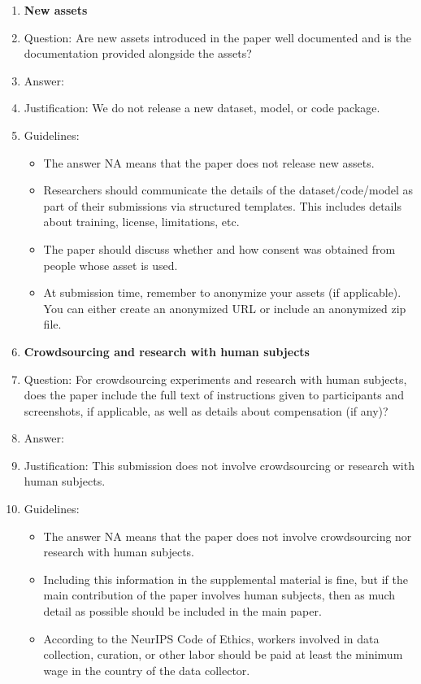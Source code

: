 \documentclass{article}
\begin{document}
\begin{enumerate}
\item {\bf New assets}
    \item[] Question: Are new assets introduced in the paper well documented and is the documentation provided alongside the assets?
    \item[] Answer: \answerNA{}
    \item[] Justification: We do not release a new dataset, model, or code package.
    \item[] Guidelines:
    \begin{itemize}
        \item The answer NA means that the paper does not release new assets.
        \item Researchers should communicate the details of the dataset/code/model as part of their submissions via structured templates. This includes details about training, license, limitations, etc. 
        \item The paper should discuss whether and how consent was obtained from people whose asset is used.
        \item At submission time, remember to anonymize your assets (if applicable). You can either create an anonymized URL or include an anonymized zip file.
    \end{itemize}

\item {\bf Crowdsourcing and research with human subjects}
    \item[] Question: For crowdsourcing experiments and research with human subjects, does the paper include the full text of instructions given to participants and screenshots, if applicable, as well as details about compensation (if any)? 
    \item[] Answer: \answerNA{}
    \item[] Justification: This submission does not involve crowdsourcing or research with human subjects.
    \item[] Guidelines:
    \begin{itemize}
        \item The answer NA means that the paper does not involve crowdsourcing nor research with human subjects.
        \item Including this information in the supplemental material is fine, but if the main contribution of the paper involves human subjects, then as much detail as possible should be included in the main paper. 
        \item According to the NeurIPS Code of Ethics, workers involved in data collection, curation, or other labor should be paid at least the minimum wage in the country of the data collector. 
    \end{itemize}


\end{enumerate}
\end{document}
